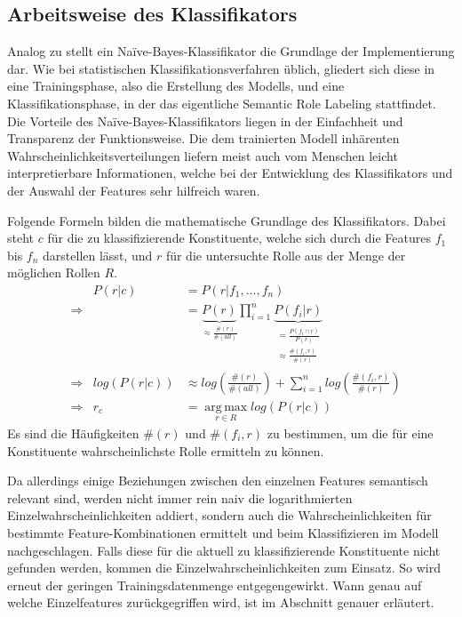 \documentclass[12pt]{article}
\begin{document}
\subsection{Arbeitsweise des Klassifikators}

Analog zu \cite{gildea} stellt ein Naïve-Bayes-Klassifikator die Grundlage der Implementierung dar. Wie bei statistischen Klassifikationsverfahren üblich, gliedert sich diese in eine Trainingsphase, also die Erstellung des Modells, und eine Klassifikationsphase, in der das eigentliche Semantic Role Labeling stattfindet. Die Vorteile des Naïve-Bayes-Klassifikators liegen in der Einfachheit und Transparenz der Funktionsweise. Die dem trainierten Modell inhärenten Wahrscheinlichkeitsverteilungen liefern meist auch vom Menschen leicht interpretierbare Informationen, welche bei der Entwicklung des Klassifikators und der Auswahl der Features sehr hilfreich waren. 


Folgende Formeln bilden die mathematische Grundlage des Klassifikators. Dabei steht $c$ für die zu klassifizierende Konstituente, welche sich durch die Features $f_1$ bis $f_n$ darstellen lässt, und $r$ für die untersuchte Rolle aus der Menge der möglichen Rollen $R$.
\begin{align}
& & P(r|c)&=P(r|f_1,...,f_n)\\
&\Rightarrow & &=\underbrace{P(r)}_{\approx \frac{\#(r)}{\#(all)}}\prod_{i=1}^n \underbrace{P(f_i|r)}_{\substack{=\frac{P(f_i\cap r)}{P(r)}\\\approx\frac{\#(f_i, r)}{\#(r)}}}\\
&\Rightarrow & log(P(r|c))&\approx log\left(\frac{\#(r)}{\#(all)}\right) + \sum_{i=1}^n log\left(\frac{\#(f_i, r)}{\#(r)}\right)\label{mat:norm}\\
&\Rightarrow & r_c &= \operatorname*{arg\,max}_{r \in R} log(P(r|c))
\end{align}
Es sind die Häufigkeiten $\#(r)$ und $\#(f_i, r)$ zu bestimmen, um die für eine Konstituente wahrscheinlichste Rolle ermitteln zu können.

Da allerdings einige Beziehungen zwischen den einzelnen Features semantisch relevant sind, werden nicht immer rein naiv die logarithmierten Einzelwahrscheinlichkeiten addiert, sondern auch die Wahrscheinlichkeiten für bestimmte Feature-Kombinationen ermittelt und beim Klassifizieren im Modell nachgeschlagen. Falls diese für die aktuell zu klassifizierende Konstituente nicht gefunden werden, kommen die Einzelwahrscheinlichkeiten zum Einsatz. So wird erneut der geringen Trainingsdatenmenge entgegengewirkt. Wann genau auf welche Einzelfeatures zurückgegriffen wird, ist im Abschnitt  genauer erläutert.
\end{document}

